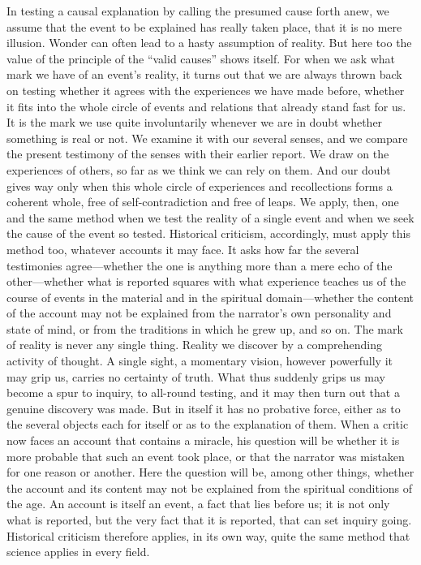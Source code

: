 \documentclass[12pt,a4paper]{article}
\newcommand{\opage}[1]{\marginnote{\footnotesize\textit{[#1]}}}
\begin{document}
In testing a causal explanation by calling the presumed cause forth anew, we assume
that the event to be explained has really taken place, that it is no mere illusion.
Wonder can often lead to a hasty assumption of reality. But here too the value of
the principle of the ``valid causes'' shows itself. For when we ask what mark we
have of an event's reality, it turns out that we are always thrown back on testing
whether it agrees with the experiences we have made before, whether it fits into the
whole circle of events and relations that already stand fast for us. It is the mark
we use quite involuntarily whenever we are in doubt whether something is real or not.
We examine it with our several senses, and we compare the present testimony of the
senses with their earlier report. We draw on the experiences of others, so far as we
think we can rely on them. And our doubt gives way only when this whole circle of
experiences and recollections forms a coherent whole, free of self-contradiction and
free of leaps. We apply, then, one and the same method when \opage{28}we test the reality of a
single event and when we seek the cause of the event so tested. Historical criticism,
accordingly, must apply this method too, whatever accounts it may face. It asks how
far the several testimonies agree---whether the one is anything more than a mere echo
of the other---whether what is reported squares with what experience teaches us of
the course of events in the material and in the spiritual domain---whether the content
of the account may not be explained from the narrator's own personality and state of
mind, or from the traditions in which he grew up, and so on. The mark of reality is
never any single thing. Reality we discover by a comprehending activity of thought. A
single sight, a momentary vision, however powerfully it may grip us, carries no
certainty of truth. What thus suddenly grips us may become a spur to inquiry, to
all-round testing, and it may then turn out that a genuine discovery was made. But in
itself it has no probative force, either as to the several objects each for itself or
as to the explanation of them. When a critic now faces an account that contains a
miracle, his question will be whether it is more probable that such an event took
place, or that the narrator was mistaken for one reason or another. Here the question
will be, among other things, whether the account and its content may not be explained
from the spiritual conditions of the age. An account is itself an event, a fact that
lies before us; it is not only what is reported, but the very fact that it is
reported, that can set inquiry going. Historical criticism therefore applies, in its
own way, quite the same method that science applies in every field.
\end{document}
